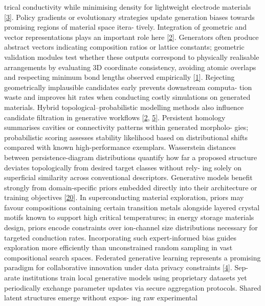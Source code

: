 \documentclass[
]{article}
\begin{document}
trical conductivity while minimising density for lightweight electrode
materials {[}\protect\hyperlink{_bookmark43}{3}{]}. Policy gradients or
evolutionary strategies update generation biases towards promising
regions of material space itera- tively. Integration of geometric and
vector representations plays an important role here
{[}\protect\hyperlink{_bookmark42}{2}{]}. Generators often produce
abstract vectors indicating composition ratios or lattice constants;
geometric validation modules test whether these outputs correspond to
physically realisable arrangements by evaluating 3D coordinate
consistency, avoiding atomic overlaps and respecting minimum bond
lengths observed empirically {[}\protect\hyperlink{_bookmark41}{1}{]}.
Rejecting geometrically implausible candidates early prevents downstream
computa- tion waste and improves hit rates when conducting costly
simulations on generated materials. Hybrid topological--probabilistic
modelling methods also influence candidate filtration in generative
workflows {[}\protect\hyperlink{_bookmark42}{2},
\protect\hyperlink{_bookmark45}{5}{]}. Persistent homology summarises
cavities or connectivity patterns within generated morpholo- gies;
probabilistic scoring assesses stability likelihood based on
distributional shifts compared with known high-performance exemplars.
Wasserstein distances between persistence-diagram distributions quantify
how far a proposed structure deviates topologically from desired target
classes without rely- ing solely on superficial similarity across
conventional descriptors. Generative models benefit strongly from
domain-specific priors embedded directly into their architecture or
training objectives {[}\protect\hyperlink{_bookmark60}{20}{]}. In
superconducting material exploration, priors may favour compositions
containing certain transition metals alongside layered crystal motifs
known to support high critical temperatures; in energy storage materials
design, priors encode constraints over ion-channel size distributions
necessary for targeted conduction rates. Incorporating such
expert-informed bias guides exploration more efficiently than
unconstrained random sampling in vast compositional search spaces.
Federated generative learning represents a promising paradigm for
collaborative innovation under data privacy constraints
{[}\protect\hyperlink{_bookmark44}{4}{]}. Sep- arate institutions train
local generative models using proprietary datasets yet periodically
exchange parameter updates via secure aggregation protocols. Shared
latent structures emerge without expos- ing raw experimental
\end{document}
